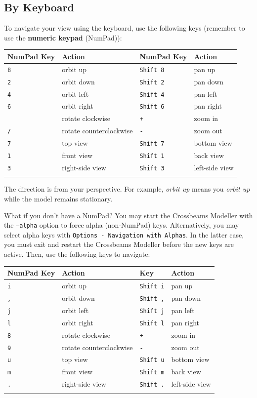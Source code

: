 \documentclass[12pt]{report}
\begin{document}
\subsection{By Keyboard}

To navigate your view using the keyboard, use the following
keys (remember to use the \textbf{numeric keypad} (NumPad)):

\begin{center}
\begin{tabular}{llll}
NumPad Key & Action & NumPad Key & Action\\
\hline
{\tt 8} & orbit up & {\tt Shift 8} & pan up\\
{\tt 2} & orbit down & {\tt Shift 2} & pan down\\
{\tt 4} & orbit left & {\tt Shift 4} & pan left\\
{\tt 6} & orbit right & {\tt Shift 6} & pan right\\
{\tt *} & rotate clockwise & {\tt +} & zoom in\\
{\tt /} & rotate counterclockwise & {\tt -} & zoom out\\
{\tt 7} & top view & {\tt Shift 7} & bottom view\\
{\tt 1} & front view & {\tt Shift 1} & back view\\
{\tt 3} & right-side view & {\tt Shift 3} &left-side view\\
\label{KeyTable}
\end{tabular}
\end{center}

The direction is from your perspective.  For example, \emph{orbit up}
means you \emph{orbit up} while the model remains stationary.

What if you don't have a NumPad?  You may start the Crossbeams
Modeller with the {\tt --alpha} option to force alpha (non-NumPad)
keys.  Alternatively, you may select alpha keys with {\tt Options -
  Navigation with Alphas}.  In the latter case, you must exit and
restart the Crossbeams Modeller before the new keys are active.  Then,
use the following keys to navigate:

\begin{center}
\begin{tabular}{llll}
NumPad Key & Action & Key & Action\\
\hline
{\tt i} & orbit up & {\tt Shift i} & pan up\\
{\tt ,} & orbit down & {\tt Shift ,} & pan down\\
{\tt j} & orbit left & {\tt Shift j} & pan left\\
{\tt l} & orbit right & {\tt Shift l} & pan right\\
{\tt 8} & rotate clockwise & {\tt +} & zoom in\\
{\tt 9} & rotate counterclockwise & {\tt -} & zoom out\\
{\tt u} & top view & {\tt Shift u} & bottom view\\
{\tt m} & front view & {\tt Shift m} & back view\\
{\tt .} & right-side view & {\tt Shift .} &left-side view\\
\label{AlternateKeyTable}
\end{tabular}
\end{center}
\end{document}
